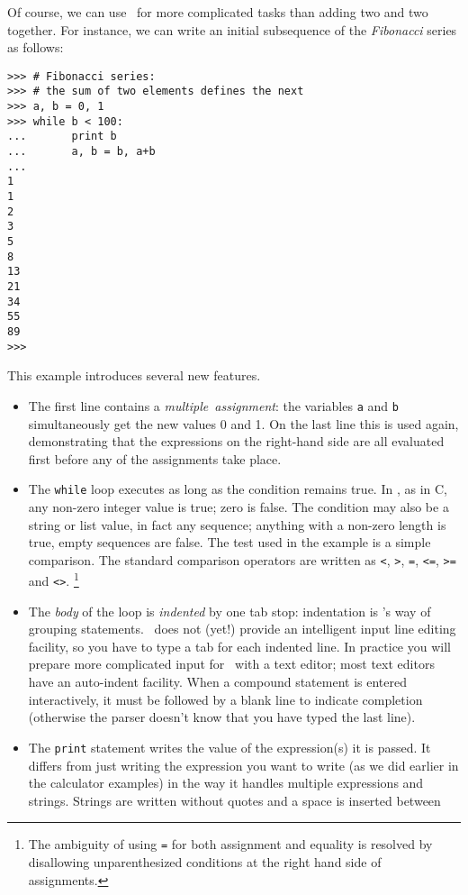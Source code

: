 Of course, we can use \Python\ for more complicated tasks than adding two
and two together.
For instance, we can write an initial subsequence of the
{\it Fibonacci}
series as follows:
\begin{code}\begin{verbatim}
>>> # Fibonacci series:
>>> # the sum of two elements defines the next
>>> a, b = 0, 1
>>> while b < 100:
...       print b
...       a, b = b, a+b
... 
1
1
2
3
5
8
13
21
34
55
89
>>> 
\end{verbatim}\end{code}
This example introduces several new features.
\begin{itemize}
\item
The first line contains a
{\it multiple\ assignment}:
the variables
{\tt a}
and
{\tt b}
simultaneously get the new values 0 and 1.
On the last line this is used again, demonstrating that the expressions
on the right-hand side are all evaluated first before any of the
assignments take place.
\item
The
{\tt while}
loop executes as long as the condition remains true.
In \Python, as in C, any non-zero integer value is true; zero is false.
The condition may also be a string or list value, in fact any sequence;
anything with a non-zero length is true, empty sequences are false.
The test used in the example is a simple comparison.
The standard comparison operators are written as
{\tt <},
{\tt >},
{\tt =},
{\tt <=},
{\tt >=}
and
{\tt <>}.%
\footnote{
	The ambiguity of using {\tt =}
	for both assignment and equality is resolved by disallowing
	unparenthesized conditions at the right hand side of assignments.
}
\item
The
{\it body}
of the loop is
{\it indented}
by one tab stop: indentation is \Python's way of grouping statements.
\Python\ does not (yet!) provide an intelligent input line editing
facility, so you have to type a tab for each indented line.
In practice you will prepare more complicated input for \Python\ with a
text editor; most text editors have an auto-indent facility.
When a compound statement is entered interactively, it must be
followed by a blank line to indicate completion (otherwise the parser
doesn't know that you have typed the last line).
\item
The
{\tt print}
statement writes the value of the expression(s) it is passed.
It differs from just writing the expression you want to write (as we did
earlier in the calculator examples) in the way it handles multiple
expressions and strings.
Strings are written without quotes and a space is inserted between

\end{itemize}
